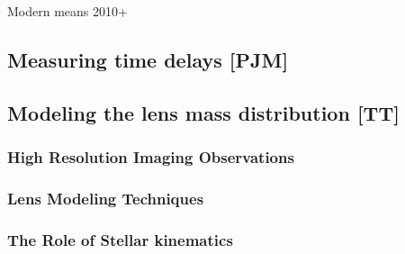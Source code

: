 Modern means 2010+


\subsection{Measuring time delays [PJM]}
\label{sec:measurement:timedelay}




\subsection{Modeling the lens mass distribution [TT]}
\label{sec:measurement:lensmodel}



\subsubsection{High Resolution Imaging Observations}




\subsubsection{Lens Modeling Techniques}





\subsubsection{The Role of Stellar kinematics}


